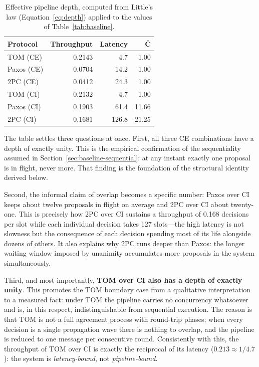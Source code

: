 \documentclass[journal]{IEEEtran}
\newcommand{\CI}{CI}                      %
\newcommand{\CE}{CE}                      %
\newcommand{\Cdepth}{\bar{C}}             %
\begin{document}
\begin{table}[!t]
\caption{Effective pipeline depth, computed from Little's law
(Equation~\eqref{eq:depth}) applied to the values of
Table~\ref{tab:baseline}.}
\label{tab:depth}
\centering
\footnotesize
\begin{tabular}{@{}lrrr@{}}
\toprule
\textbf{Protocol} & \textbf{Throughput} & \textbf{Latency} &
$\boldsymbol{\Cdepth}$ \\
\midrule
TOM (\CE)   & 0.2143 & 4.7   & 1.00 \\
Paxos (\CE) & 0.0704 & 14.2  & 1.00 \\
2PC (\CE)   & 0.0412 & 24.3  & 1.00 \\
\addlinespace
TOM (\CI)   & 0.2132 & 4.7   & 1.00 \\
Paxos (\CI) & 0.1903 & 61.4  & 11.66 \\
2PC (\CI)   & 0.1681 & 126.8 & 21.25 \\
\bottomrule
\end{tabular}
\end{table}

The table settles three questions at once. First, all three \CE{}
combinations have a depth of exactly unity. This is the empirical
confirmation of the sequentiality assumed in
Section~\ref{sec:baseline-sequential}: at any instant exactly one proposal
is in flight, never more. That finding is the foundation of the structural
identity derived below.

Second, the informal claim of overlap becomes a specific number: Paxos
over \CI{} keeps about twelve proposals in flight on average and 2PC over
\CI{} about twenty-one. This is precisely how 2PC over \CI{} sustains a
throughput of 0.168 decisions per slot while each individual decision
takes 127 slots---the high latency is not slowness but the consequence of
each decision spending most of its life alongside dozens of others. It
also explains why 2PC runs deeper than Paxos: the longer waiting window
imposed by unanimity accumulates more proposals in the system
simultaneously.

Third, and most importantly, \textbf{TOM over \CI{} also has a depth of
exactly unity}. This promotes the TOM boundary case from a qualitative
interpretation to a measured fact: under TOM the pipeline carries no
concurrency whatsoever and is, in this respect, indistinguishable from
sequential execution. The reason is that TOM is not a full agreement
process with round-trip phases; when every decision is a single
propagation wave there is nothing to overlap, and the pipeline is reduced
to one message per consecutive round. Consistently with this, the
throughput of TOM over \CI{} is exactly the reciprocal of its latency
($0.213 \approx 1/4.7$): the system is \emph{latency-bound}, not
\emph{pipeline-bound}.
\end{document}
